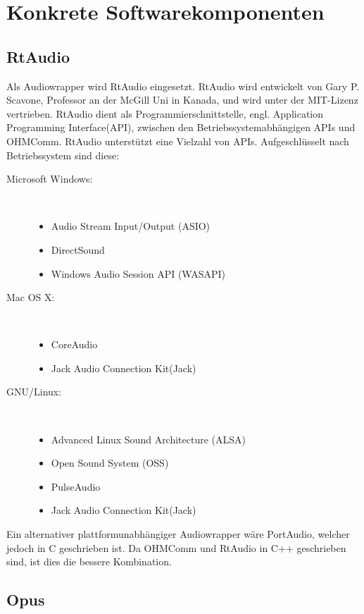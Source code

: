 \FloatBarrier

\section{Konkrete Softwarekomponenten}
\subsection{RtAudio}
\label{sec:RtAudio}
Als Audiowrapper wird RtAudio eingesetzt. RtAudio wird entwickelt von Gary P. Scavone, Professor an der McGill Uni in Kanada, und wird unter der MIT-Lizenz vertrieben. RtAudio dient als Programmierschnittstelle, engl. Application Programming Interface(API), zwischen den Betriebssystemabhängigen APIs und OHMComm. RtAudio unterstützt eine Vielzahl von APIs. Aufgeschlüsselt nach Betriebssystem sind diese:

\begin{description}
\item[Microsoft Windows:]~\par
\begin{itemize}
\item Audio Stream Input/Output (ASIO)
\item DirectSound
\item Windows Audio Session API (WASAPI)
\end{itemize}
\item[Mac OS X:]~\par
\begin{itemize}
\item CoreAudio
\item Jack Audio Connection Kit(Jack)
\end{itemize}
\item[GNU/Linux:]~\par
\begin{itemize}
\item Advanced Linux Sound Architecture (ALSA)
\item Open Sound System (OSS)
\item PulseAudio
\item Jack Audio Connection Kit(Jack)
\end{itemize} 
\end{description}

Ein alternativer plattformunabhängiger Audiowrapper wäre PortAudio, welcher jedoch in C geschrieben ist. Da OHMComm und RtAudio in C++ geschrieben sind, ist dies die bessere Kombination.

\subsection{Opus}

